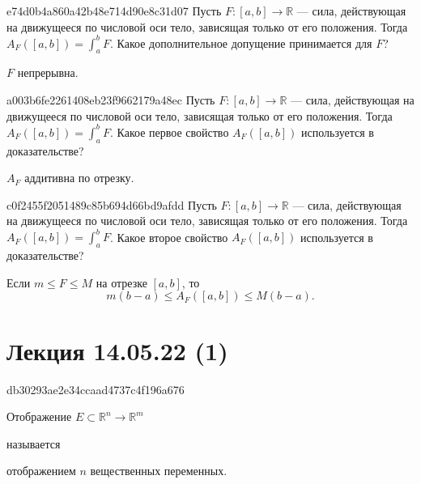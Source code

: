 \begin{note}{e74d0b4a860a42b48e714d90e8c31d07}
    Пусть \({ F : [a, b] \to \mathbb R }\) --- сила, действующая на движущееся по числовой оси тело, зависящая только от его положения.
    Тогда \({ A_{F}([a, b]) = \int_{a}^{b} F }\).
    Какое дополнительное допущение принимается для \({ F }\)?

    \begin{cloze}{1}
        \({ F }\) непрерывна.
    \end{cloze}
\end{note}

\begin{note}{a003b6fe2261408eb23f9662179a48ec}
    Пусть \({ F : [a, b] \to \mathbb R }\) --- сила, действующая на движущееся по числовой оси тело, зависящая только от его положения.
    Тогда \({ A_{F}([a, b]) = \int_{a}^{b} F }\).
    Какое первое свойство \({ A_{F}([a, b]) }\) используется в доказательстве?

    \begin{cloze}{1}
        \({ A_{F} }\) аддитивна по отрезку.
    \end{cloze}
\end{note}

\begin{note}{c0f2455f2051489c85b694d66bd9afdd}
    Пусть \({ F : [a, b] \to \mathbb R }\) --- сила, действующая на движущееся по числовой оси тело, зависящая только от его положения.
    Тогда \({ A_{F}([a, b]) = \int_{a}^{b} F }\).
    Какое второе свойство \({ A_{F}([a, b]) }\) используется в доказательстве?

    \begin{cloze}{1}
        Если \({ m \leqslant F \leqslant M }\) на отрезке \({ [a, b] }\), то
        \[
            m(b - a) \leqslant A_{F}([a, b]) \leqslant M(b - a).
        \]
    \end{cloze}
\end{note}

\section{Лекция 14.05.22 (1)}
\begin{note}{db30293ae2e34ccaad4737c4f196a676}
    \begin{icloze}{2}Отображение \({ E \subset \mathbb R^{n} \to \mathbb R^{m} }\)\end{icloze} называется \begin{icloze}{1}отображением \({ n }\) вещественных переменных.\end{icloze}
\end{note}

